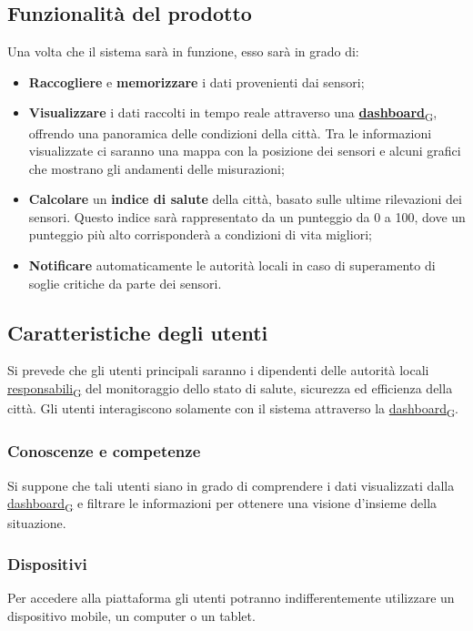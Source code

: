 \subsection{Funzionalità del prodotto}
Una volta che il sistema sarà in funzione, esso sarà in grado di:
\begin{itemize}
	\item \textbf{Raccogliere} e \textbf{memorizzare} i dati provenienti dai sensori;
	\item \textbf{Visualizzare} i dati raccolti in tempo reale attraverso una \href{https://7last.github.io/docs/rtb/documentazione-interna/glossario\#dashboard}{\textbf{dashboard}\textsubscript{G}}, offrendo una panoramica delle condizioni della città.
	      Tra le informazioni visualizzate ci saranno una mappa con la posizione dei sensori e alcuni grafici che mostrano gli andamenti delle misurazioni;
	\item \textbf{Calcolare} un \textbf{indice di salute} della città, basato sulle ultime rilevazioni dei sensori. Questo indice sarà rappresentato da un punteggio da 0 a 100, dove un punteggio più alto corrisponderà a condizioni di vita migliori;
	\item \textbf{Notificare} automaticamente le autorità locali in caso di superamento di soglie critiche da parte dei sensori.
\end{itemize}

\subsection{Caratteristiche degli utenti}
Si prevede che gli utenti principali saranno i dipendenti delle autorità locali \href{https://7last.github.io/docs/rtb/documentazione-interna/glossario\#responsabile}{responsabili\textsubscript{G}}
del monitoraggio dello stato di salute, sicurezza ed efficienza della città.
Gli utenti interagiscono solamente con il sistema attraverso la \href{https://7last.github.io/docs/rtb/documentazione-interna/glossario\#dashboard}{dashboard\textsubscript{G}}.

\subsubsection{Conoscenze e competenze}
Si suppone che tali utenti siano in grado di comprendere i dati visualizzati dalla \href{https://7last.github.io/docs/rtb/documentazione-interna/glossario\#dashboard}{dashboard\textsubscript{G}} e filtrare le informazioni
per ottenere una visione d'insieme della situazione.

\subsubsection{Dispositivi}
Per accedere alla piattaforma gli utenti potranno indifferentemente utilizzare un dispositivo mobile, un computer o un tablet.






